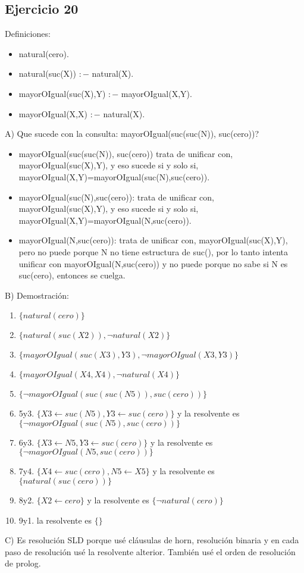 \documentclass[10pt,a4paper]{article}
\begin{document}
\subsection{Ejercicio 20}
     Definiciones:
    \begin{itemize}
        \item natural(cero).
        \item natural(suc(X)) $:-$ natural(X).
        \item mayorOIgual(suc(X),Y) $:-$ mayorOIgual(X,Y).
        \item mayorOIgual(X,X) $:-$ natural(X).
    \end{itemize}
    A) Que sucede con la consulta: mayorOIgual(suc(suc(N)), suc(cero))?
    \begin{itemize}
        \item mayorOIgual(suc(suc(N)), suc(cero)) trata de unificar con, mayorOIgual(suc(X),Y), y eso sucede si y solo si, mayorOIgual(X,Y)=mayorOIgual(suc(N),suc(cero)).
        \item mayorOIgual(suc(N),suc(cero)): trata de unificar con, mayorOIgual(suc(X),Y), y eso sucede si y solo si, mayorOIgual(X,Y)=mayorOIgual(N,suc(cero)).
        \item mayorOIgual(N,suc(cero)): trata de unificar con, mayorOIgual(suc(X),Y), pero no puede porque N no tiene estructura de suc(), por lo tanto intenta unificar con mayorOIgual(N,suc(cero)) y no puede porque no sabe si N es suc(cero), entonces se cuelga. 
    \end{itemize}
    B) Demostración:
    \begin{enumerate}
    \item $\{natural(cero) \}$
    \item $\{natural(suc(X2)), \neg natural(X2) \}$
    \item $\{mayorOIgual(suc(X3),Y3), \neg mayorOIgual(X3,Y3) \}$
    \item $\{mayorOIgual(X4,X4), \neg natural(X4) \}$
    \item $\{ \neg mayorOIgual(suc(suc(N5)),suc(cero))\}$
    \item 5y3. $\{X3 \leftarrow suc(N5), Y3 \leftarrow suc(cero)\}$ y la resolvente es $\{ \neg mayorOIgual(suc(N5),suc(cero))\}$
    \item 6y3. $\{X3 \leftarrow N5, Y3 \leftarrow suc(cero)\}$ y la resolvente es $\{ \neg mayorOIgual(N5,suc(cero))\}$
    \item 7y4. $\{X4 \leftarrow suc(cero),N5 \leftarrow X5\}$ y la resolvente es $\{natural(suc(cero))\}$
    \item 8y2. $\{X2 \leftarrow cero\}$ y la resolvente es $\{ \neg natural(cero)\}$
    \item 9y1. la resolvente es $\{\}$
    \end{enumerate}
    C) Es resolución SLD porque usé cláusulas de horn, resolución binaria y en cada paso de resolución usé la resolvente alterior. También usé el orden de resolución de prolog.
\end{document}
